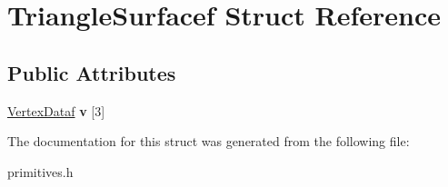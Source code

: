 \hypertarget{structTriangleSurfacef}{\section{\-Triangle\-Surfacef \-Struct \-Reference}
\label{structTriangleSurfacef}
}
\subsection*{\-Public \-Attributes}
\begin{DoxyCompactItemize}
\item 
\hypertarget{structTriangleSurfacef_af477eca15a64fa610c0704ba2cc5fa46}{\hyperlink{structVertexDataf}{\-Vertex\-Dataf} {\bfseries v} \mbox{[}3\mbox{]}}\label{structTriangleSurfacef_af477eca15a64fa610c0704ba2cc5fa46}

\end{DoxyCompactItemize}


\-The documentation for this struct was generated from the following file\-:\begin{DoxyCompactItemize}
\item 
primitives.\-h\end{DoxyCompactItemize}
